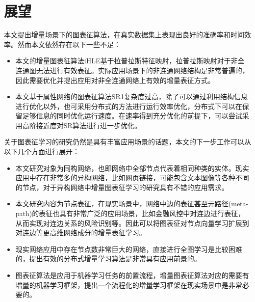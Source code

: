 \section{展望}
本文提出增量场景下的图表征算法，在真实数据集上表现出良好的准确率和时间效率。然而本文依然存在以下一些不足：
\begin{itemize}
	\item 本文的增量图表征算法iHLE基于拉普拉斯特征映射，拉普拉斯映射对于非全连通图无法进行有效表征。实际应用场景下的非连通网络结构是非常普遍的，因此需要优化并提出应用对非全连通网络上有效的增量表征方式。
	\item 本文基于属性网络的图表征算法SR1复杂度过高，除了可以通过利用结构信息进行优化以外，也可采用分布式的方法进行运行效率优化，分布式下可以在保留足够信息的同时优化运行速度。在速率得到充分优化的前提下，可以尝试采用高阶接近度对SR算法进行进一步优化。 
\end{itemize}
关于图表征学习的研究仍然是具有丰富应用场景的话题，本文的下一步工作可以从以下几个方面进行展开：
\begin{itemize}
	\item 本文研究对象为同构网络，也即网络中全部节点代表着相同种类的实体。现实应用中存在非常多的异构网络，比如网页链接，可能包含文本图像等各种不同的节点，对于异构网络中增量图表征学习的研究具有不错的应用需求。
	\item 本文研究内容为节点表征，在现实场景中，网络中边的表征甚至元路径(meta-path)的表征也具有非常广泛的应用场景，比如金融风控中对连边进行表征，从而实现对连边关系的风险识别等。因此可以将图表征对节点向量学习扩展到对连边等更高维网络成分的增量表征学习。
	\item 现实网络应用中存在节点数非常巨大的网络，直接进行全图学习是比较困难的，提出有效的分布式增量学习算法是非常具有应用前景的。
	\item 图表征算法是应用于机器学习任务的前置流程，增量图表征算法对应的需要有增量的机器学习框架，提出一个流程化的增量学习框架在现实场景中是非常必要的。
\end{itemize}